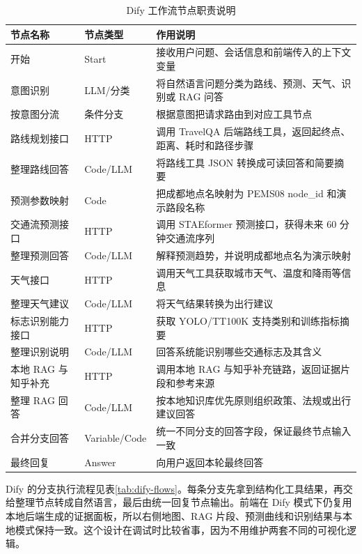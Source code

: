 \documentclass[bwprint]{report}
\begin{document}
\begin{table}[H]
    \caption{Dify 工作流节点职责说明}
    \label{tab:dify-nodes}
    \centering
    \small
    \begin{tabular}{p{}p{}p{}}
        \toprule[1.5pt]
        节点名称 & 节点类型 & 作用说明 \\
        \midrule[1pt]
        开始 & Start & 接收用户问题、会话信息和前端传入的上下文变量 \\
        意图识别 & LLM/分类 & 将自然语言问题分类为路线、预测、天气、识别或 RAG 问答 \\
        按意图分流 & 条件分支 & 根据意图把请求路由到对应工具节点 \\
        路线规划接口 & HTTP & 调用 TravelQA 后端路线工具，返回起终点、距离、耗时和路径步骤 \\
        整理路线回答 & Code/LLM & 将路线工具 JSON 转换成可读回答和简要摘要 \\
        预测参数映射 & Code & 把成都地点名映射为 PEMS08 node\_id 和演示路段名称 \\
        交通流预测接口 & HTTP & 调用 STAEformer 预测接口，获得未来 60 分钟交通流序列 \\
        整理预测回答 & Code/LLM & 解释预测趋势，并说明成都地点名为演示映射 \\
        天气接口 & HTTP & 调用天气工具获取城市天气、温度和降雨等信息 \\
        整理天气建议 & Code/LLM & 将天气结果转换为出行建议 \\
        标志识别能力接口 & HTTP & 获取 YOLO/TT100K 支持类别和训练指标摘要 \\
        整理识别说明 & Code/LLM & 回答系统能识别哪些交通标志及其含义 \\
        本地 RAG 与知乎补充 & HTTP & 调用本地 RAG 与知乎补充链路，返回证据片段和参考来源 \\
        整理 RAG 回答 & Code/LLM & 按本地知识库优先原则组织政策、法规或出行建议回答 \\
        合并分支回答 & Variable/Code & 统一不同分支的回答字段，保证最终节点输入一致 \\
        最终回复 & Answer & 向用户返回本轮最终回答 \\
        \bottomrule[1.5pt]
    \end{tabular}
\end{table}

Dify 的分支执行流程见表\ref{tab:dify-flows}。每条分支先拿到结构化工具结果，再交给整理节点转成自然语言，最后由统一回复节点输出。前端在 Dify 模式下仍复用本地后端生成的证据面板，所以右侧地图、RAG 片段、预测曲线和识别结果与本地模式保持一致。这个设计在调试时比较省事，因为不用维护两套不同的可视化逻辑。
\end{document}
